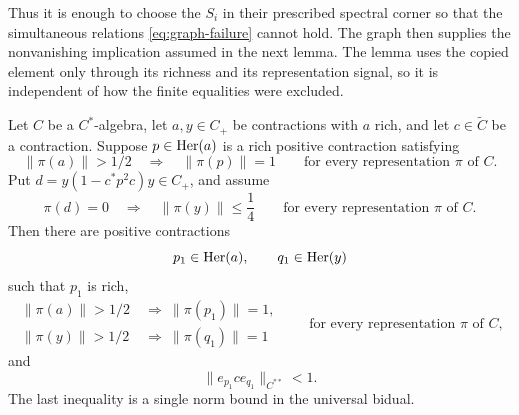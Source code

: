 Thus it is enough to choose the \(S_i\) in their prescribed
spectral corner so that the simultaneous relations
\eqref{eq:graph-failure} cannot hold.  The graph then supplies
the nonvanishing implication assumed in the next lemma.  The
lemma uses the copied element only through its richness and
its representation signal, so it is independent of how the
finite equalities were excluded.

\begin{lemma}\label{lem:conditional-shrinking}
Let \(C\) be a \(C^*\)-algebra, let \(a,y\in C_+\) be
contractions with \(a\) rich, and let \(c\in\widetilde C\) be
a contraction.  Suppose \(p\in\operatorname{Her}(a)\) is a rich positive
contraction satisfying
\[
 \|\pi(a)\|>1/2\quad\Longrightarrow\quad\|\pi(p)\|=1
 \qquad\text{for every representation }\pi\text{ of }C.
\]
Put \(d=y(1-c^*p^2c)y\in C_+\), and assume
\begin{equation}\label{eq:common-nonvanishing}
 \pi(d)=0\quad\Longrightarrow\quad\|\pi(y)\|\le\frac14
 \qquad\text{for every representation }\pi\text{ of }C.
\end{equation}
Then there are positive contractions
\[
 p_1\in\operatorname{Her}(a),\qquad q_1\in\operatorname{Her}(y)
\]
such that \(p_1\) is rich,
\begin{equation}\label{eq:shrinking-signals}
 \begin{split}
  \|\pi(a)\|>1/2&\ \Longrightarrow\ \|\pi(p_1)\|=1,\\
  \|\pi(y)\|>1/2&\ \Longrightarrow\ \|\pi(q_1)\|=1
 \end{split}
 \qquad\text{for every representation }\pi\text{ of }C,
\end{equation}
and
\begin{equation}\label{eq:shrinking-support}
 \|e_{p_1}c e_{q_1}\|_{C^{**}}<1.
\end{equation}
The last inequality is a single norm bound in the universal
bidual.
\end{lemma}

